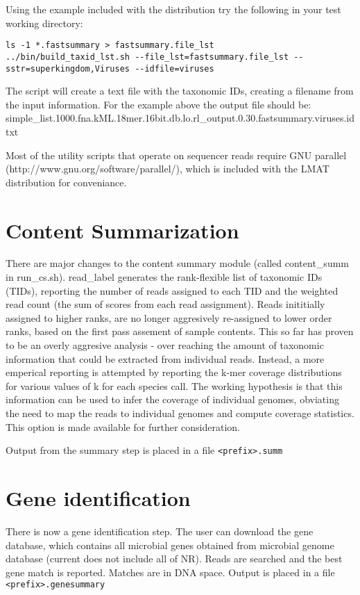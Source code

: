 \documentclass[11pt]{article}
\begin{document}
Using the example included with the distribution try the following in your test working directory:
\begin{verbatim}
ls -1 *.fastsummary > fastsummary.file_lst
../bin/build_taxid_lst.sh --file_lst=fastsummary.file_lst --sstr=superkingdom,Viruses --idfile=viruses
\end{verbatim}

The script will create a text file with the taxonomic IDs, creating a filename from the input information. For the example above the output file should be:
simple_list.1000.fna.kML.18mer.16bit.db.lo.rl_output.0.30.fastsummary.viruses.idtxt




Most of the utility scripts that operate on sequencer reads require
GNU parallel (http://www.gnu.org/software/parallel/), which is included with the LMAT distribution for conveniance.

\section{Content Summarization}
There are major changes to the content summary module (called {content_summ} in
 {run\_cs.sh}).  {read\_label} generates the rank-flexible list of
 taxonomic IDs (TIDs), reporting the number of reads assigned to each
 TID and the weighted read count (the sum of scores from each read
 assignment). Reads inititially assigned to higher ranks, are no longer
aggresively re-assigned to lower order ranks, based on the first pass
assement of sample contents. This so far has proven to be an overly aggresive
analysis - over reaching the amount of taxonomic information that could be extracted from
individual reads. Instead, a more emperical reporting is attempted by reporting the
k-mer coverage distributions for various values of k for each species call.  The working
hypothesis is that this information can be used to infer the coverage of individual genomes,
obviating the need to map the reads to individual genomes and compute coverage statistics.
This option is made available for further consideration.

Output from the summary step is placed in a file \texttt{<prefix>.summ}

\section{Gene identification}

There is now a gene identification step.  The user can download the gene database, which contains all microbial genes obtained from microbial genome database (current does not include all of NR). Reads are searched and the best gene match is reported.  Matches are in DNA space. Output is placed in a file \texttt{<prefix>.genesummary}
\end{document}

